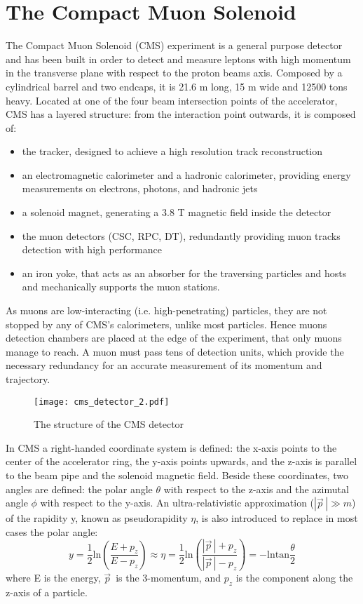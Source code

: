 \documentclass[12pt,twoside,a4paper]{report}
\numberwithin{equation}{section}
\begin{document}
\section{The Compact Muon Solenoid}
The Compact Muon Solenoid (CMS) experiment is a general purpose detector and has been built in order to detect and measure leptons with high momentum in the transverse plane with respect to the proton beams axis. Composed by a cylindrical barrel and two endcaps, it is 21.6 m long, 15 m wide and 12500 tons heavy.
Located at one of the four beam intersection points of the accelerator, CMS has a layered structure: from the interaction point outwards, it is composed of:
\begin{itemize}
\item the tracker, designed to achieve a high resolution track reconstruction
\item an electromagnetic calorimeter and a hadronic calorimeter, providing energy measurements on electrons, photons, and hadronic jets
\item a solenoid magnet, generating a 3.8 T magnetic field inside the detector
\item the muon detectors (CSC, RPC, DT), redundantly providing muon tracks detection with high performance
\item an iron yoke, that acts as an absorber for the traversing particles and hosts and mechanically supports the muon stations.
\end{itemize}

As muons are low-interacting (i.e. high-penetrating) particles, they are not stopped by any of CMS's calorimeters, unlike most particles. Hence muons detection chambers are placed at the edge of the experiment, that only muons manage to reach.
A muon must pass tens of detection units, which provide the necessary redundancy for an accurate measurement of its momentum and trajectory.
\begin{figure}[!htb]
\texttt{[image: cms\_detector\_2.pdf]}
\caption{\label{fig:cms} The structure of the CMS detector}
\end{figure}

In CMS a right-handed coordinate system is defined: the x-axis points to the center of the accelerator ring, the y-axis points upwards, and the z-axis is parallel to the beam pipe and the solenoid magnetic field. Beside these coordinates, two angles are defined: the polar angle $\theta$ with respect to the z-axis and the azimutal angle $\phi$ with respect to the y-axis.
An ultra-relativistic approximation ($|\vec{p}^{\,}| \gg m$) of the rapidity y, known as pseudorapidity $\eta$, is also introduced to replace in most cases the polar angle:
$$y = \frac{1}{2} \mathrm{ln} \left(\frac{E+p_{z}}{E-p_{z}}\right) \approx \eta =\frac{1}{2} \mathrm{ln} \left(\frac{|\vec{p}^{\,}|+p_{z}}{|\vec{p}^{\,}|-p_{z}}\right) = -\mathrm{ln tan} \frac{\theta}{2} $$
where E is the energy, $\vec{p}^{\,}$ is the 3-momentum, and $p_{z}$ is the component along the z-axis of a particle.
\end{document}
